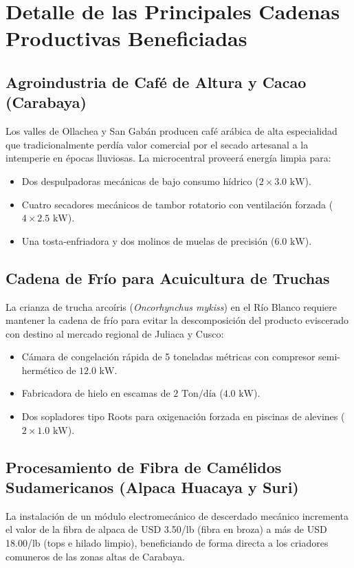 \documentclass[11pt,a4paper]{report}
\begin{document}
\section{Detalle de las Principales Cadenas Productivas Beneficiadas}
\subsection{Agroindustria de Café de Altura y Cacao (Carabaya)}
Los valles de Ollachea y San Gabán producen café arábica de alta especialidad que tradicionalmente perdía valor comercial por el secado artesanal a la intemperie en épocas lluviosas. La microcentral proveerá energía limpia para:
\begin{itemize}
    \item Dos despulpadoras mecánicas de bajo consumo hídrico ($2 \times 3.0\text{ kW}$).
    \item Cuatro secadores mecánicos de tambor rotatorio con ventilación forzada ($4 \times 2.5\text{ kW}$).
    \item Una tosta-enfriadora y dos molinos de muelas de precisión ($6.0\text{ kW}$).
\end{itemize}

\subsection{Cadena de Frío para Acuicultura de Truchas}
La crianza de trucha arcoíris (\textit{Oncorhynchus mykiss}) en el Río Blanco requiere mantener la cadena de frío para evitar la descomposición del producto eviscerado con destino al mercado regional de Juliaca y Cusco:
\begin{itemize}
    \item Cámara de congelación rápida de 5 toneladas métricas con compresor semi-hermético de $12.0\text{ kW}$.
    \item Fabricadora de hielo en escamas de $2\text{ Ton/día}$ ($4.0\text{ kW}$).
    \item Dos sopladores tipo Roots para oxigenación forzada en piscinas de alevines ($2 \times 1.0\text{ kW}$).
\end{itemize}

\subsection{Procesamiento de Fibra de Camélidos Sudamericanos (Alpaca Huacaya y Suri)}
La instalación de un módulo electromecánico de descerdado mecánico incrementa el valor de la fibra de alpaca de USD 3.50/lb (fibra en broza) a más de USD 18.00/lb (tops e hilado limpio), beneficiando de forma directa a los criadores comuneros de las zonas altas de Carabaya.
\end{document}
